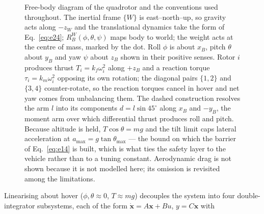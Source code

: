 \documentclass[10pt,letterpaper]{article}
\begin{document}
\begin{figure}[tbp]
\begin{tikzpicture}
    \end{tikzpicture}
    \caption{Free-body diagram of the quadrotor and the conventions used throughout. The
        inertial frame $\{W\}$ is east--north--up, so gravity acts along $-z_W$ and the
        translational dynamics take the form of Eq.~\eqref{eq:e24}; $R^W_B(\phi,\theta,\psi)$
        maps body to world; the weight acts at the centre of mass, marked by the dot. Roll $\phi$ is about $x_B$, pitch $\theta$ about $y_B$ and yaw
        $\psi$ about $z_B$ shown in their positive senses. Rotor $i$ produces thrust
        $T_i=k_f\omega_i^2$ along $+z_B$ and a reaction torque $\tau_i=k_m\omega_i^2$ opposing
        its own rotation; the diagonal pairs $\{1,2\}$ and $\{3,4\}$ counter-rotate, so the
        reaction torques cancel in hover and net yaw comes from unbalancing them. The dashed
        construction resolves the arm $l$ into its components $d=l\sin45^\circ$ along $x_B$
        and $-y_B$, the moment arm over which differential thrust produces roll and pitch.
        Because altitude is held, $T\cos\theta=mg$ and the tilt limit caps lateral
        acceleration at $a_{\max}=g\tan\theta_{\max}$ --- the bound on which the barrier of
        Eq.~\eqref{eq:e14} is built, which is what ties the safety layer to the vehicle rather
        than to a tuning constant. Aerodynamic drag is not shown because it is not modelled
        here; its omission is revisited among the limitations.}
    \label{fig:fbd}
\end{figure}


Linearising about hover ($\phi,\theta\approx 0$, $T\approx mg$) decouples the system into
four double-integrator subsystems, each of the form
$\dot{\mathbf{x}}=A\mathbf{x}+Bu$, $y=C\mathbf{x}$ with
\end{document}
